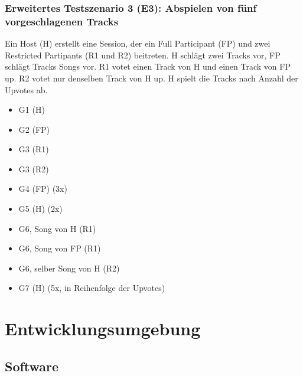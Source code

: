 \documentclass[oneside, ngerman]{sdqtechreport}
\begin{document}
\subsection{Erweitertes Testszenario 3 (E3): Abspielen von fünf vorgeschlagenen Tracks}
\label{subsec:Tests:ErweiterteTestszenarien:E3}
Ein Host (H) erstellt eine Session, der ein Full Participant (FP) und zwei Restricted Partipants (R1 und R2) beitreten. H schlägt zwei Tracks vor, FP schlägt Tracks Songs vor. R1 votet einen Track von H und einen Track von FP up. R2 votet nur denselben Track von H up. H spielt die Tracks nach Anzahl der Upvotes ab.
\begin{itemize}
    \item G1 (H)
    \item G2 (FP)
    \item G3 (R1)
    \item G3 (R2)
    \item G4 (FP) (3x)
    \item G5 (H) (2x)
    \item G6, Song von H (R1)
    \item G6, Song von FP (R1)
    \item G6, selber Song von H (R2)
    \item G7 (H) (5x, in Reihenfolge der Upvotes)
\end{itemize}


\chapter{Entwicklungsumgebung}
\label{chap:Entwicklungsumgebung}

\section{Software}
\label{sec:Entwicklungsumgebung:Software}
\end{document}
